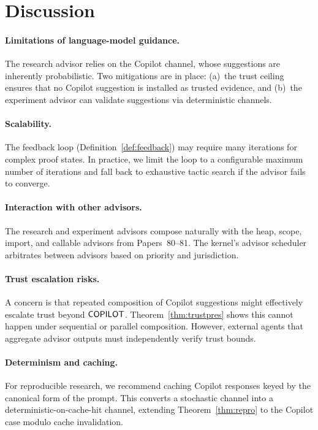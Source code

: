 \documentclass[11pt]{article}
\begin{document}
\section{Discussion}\label{sec:discussion}

\paragraph{Limitations of language-model guidance.}
The research advisor relies on the Copilot channel, whose
suggestions are inherently probabilistic.  Two mitigations
are in place: (a)~the trust ceiling ensures that no Copilot
suggestion is installed as trusted evidence, and (b)~the
experiment advisor can validate suggestions via deterministic
channels.

\paragraph{Scalability.}
The feedback loop (Definition~\ref{def:feedback}) may
require many iterations for complex proof states.  In
practice, we limit the loop to a configurable maximum
number of iterations and fall back to exhaustive tactic
search if the advisor fails to converge.

\paragraph{Interaction with other advisors.}
The research and experiment advisors compose naturally
with the heap, scope, import, and callable advisors
from Papers~80--81.  The kernel's advisor scheduler
arbitrates between advisors based on priority and
jurisdiction.

\paragraph{Trust escalation risks.}
A concern is that repeated composition of Copilot
suggestions might effectively escalate trust beyond
$\mathsf{COPILOT}$.  Theorem~\ref{thm:trustpres} shows this
cannot happen under sequential or parallel composition.
However, external agents that aggregate advisor outputs
must independently verify trust bounds.

\paragraph{Determinism and caching.}
For reproducible research, we recommend caching Copilot
responses keyed by the canonical form of the prompt.
This converts a stochastic channel into a
deterministic-on-cache-hit channel, extending
Theorem~\ref{thm:repro} to the Copilot case modulo
cache invalidation.
\end{document}

